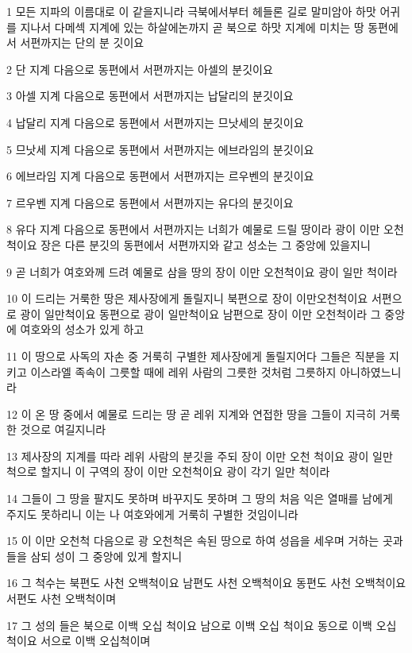 \par 1 모든 지파의 이름대로 이 같을지니라 극북에서부터 헤들론 길로 말미암아 하맛 어귀를 지나서 다메섹 지계에 있는 하살에논까지 곧 북으로 하맛 지계에 미치는 땅 동편에서 서편까지는 단의 분 깃이요
\par 2 단 지계 다음으로 동편에서 서편까지는 아셀의 분깃이요
\par 3 아셀 지계 다음으로 동편에서 서편까지는 납달리의 분깃이요
\par 4 납달리 지계 다음으로 동편에서 서편까지는 므낫세의 분깃이요
\par 5 므낫세 지계 다음으로 동편에서 서편까지는 에브라임의 분깃이요
\par 6 에브라임 지계 다음으로 동편에서 서편까지는 르우벤의 분깃이요
\par 7 르우벤 지계 다음으로 동편에서 서편까지는 유다의 분깃이요
\par 8 유다 지계 다음으로 동편에서 서편까지는 너희가 예물로 드릴 땅이라 광이 이만 오천척이요 장은 다른 분깃의 동편에서 서편까지와 같고 성소는 그 중앙에 있을지니
\par 9 곧 너희가 여호와께 드려 예물로 삼을 땅의 장이 이만 오천척이요 광이 일만 척이라
\par 10 이 드리는 거룩한 땅은 제사장에게 돌릴지니 북편으로 장이 이만오천척이요 서편으로 광이 일만척이요 동편으로 광이 일만척이요 남편으로 장이 이만 오천척이라 그 중앙에 여호와의 성소가 있게 하고
\par 11 이 땅으로 사독의 자손 중 거룩히 구별한 제사장에게 돌릴지어다 그들은 직분을 지키고 이스라엘 족속이 그릇할 때에 레위 사람의 그릇한 것처럼 그릇하지 아니하였느니라
\par 12 이 온 땅 중에서 예물로 드리는 땅 곧 레위 지계와 연접한 땅을 그들이 지극히 거룩한 것으로 여길지니라
\par 13 제사장의 지계를 따라 레위 사람의 분깃을 주되 장이 이만 오천 척이요 광이 일만 척으로 할지니 이 구역의 장이 이만 오천척이요 광이 각기 일만 척이라
\par 14 그들이 그 땅을 팔지도 못하며 바꾸지도 못하며 그 땅의 처음 익은 열매를 남에게 주지도 못하리니 이는 나 여호와에게 거룩히 구별한 것임이니라
\par 15 이 이만 오천척 다음으로 광 오천척은 속된 땅으로 하여 성읍을 세우며 거하는 곳과 들을 삼되 성이 그 중앙에 있게 할지니
\par 16 그 척수는 북편도 사천 오백척이요 남편도 사천 오백척이요 동편도 사천 오백척이요 서편도 사천 오백척이며
\par 17 그 성의 들은 북으로 이백 오십 척이요 남으로 이백 오십 척이요 동으로 이백 오십척이요 서으로 이백 오십척이며
